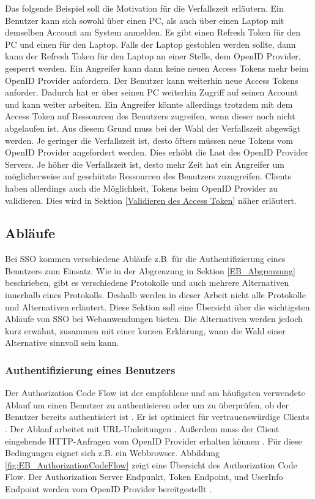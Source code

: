 Das folgende Beispiel soll die Motivation für die Verfallszeit erläutern. Ein Benutzer kann sich sowohl über einen PC, als auch über einen Laptop mit demselben Account am System anmelden. Es gibt einen Refresh Token für den PC und einen für den Laptop. Falls der Laptop gestohlen werden sollte, dann kann der Refresh Token für den Laptop an einer Stelle, dem OpenID Provider, gesperrt werden. Ein Angreifer kann dann keine neuen Access Tokens mehr beim OpenID Provider anfordern. Der Benutzer kann weiterhin neue Access Tokens anforder. Dadurch hat er über seinen PC weiterhin Zugriff auf seinen Account und kann weiter arbeiten. Ein Angreifer könnte allerdings trotzdem mit dem Access Token auf Ressourcen des Benutzers zugreifen, wenn dieser noch nicht abgelaufen ist. Aus diesem Grund muss bei der Wahl der Verfallszeit abgewägt werden. Je geringer die Verfallszeit ist, desto öfters müssen neue Tokens vom OpenID Provider angefordert werden. Dies erhöht die Last des OpenID Provider Servers. Je höher die Verfallszeit ist, desto mehr Zeit hat ein Angreifer um möglicherweise auf geschützte Ressourcen des Benutzers zuzugreifen. Clients haben allerdings auch die Möglichkeit, Tokens beim OpenID Provider zu validieren. Dies wird in Sektion \ref{Validieren des Access Token} näher erläutert.

\subsection{Abläufe} \label{EB_Abläufe}

Bei SSO kommen verschiedene Abläufe z.B. für die Authentifizierung eines Benutzers zum Einsatz. Wie in der Abgrenzung in Sektion \ref{EB_Abgrenzung} beschrieben, gibt es verschiedene Protokolle und auch mehrere Alternativen innerhalb eines Protokolls. Deshalb werden in dieser Arbeit nicht alle Protokolle und Alternativen erläutert. Diese Sektion soll eine Übersicht über die wichtigsten Abläufe von SSO bei Webanwendungen bieten. Die Alternativen werden jedoch kurz erwähnt, zusammen mit einer kurzen Erklärung, wann die Wahl einer Alternative sinnvoll sein kann. %

\subsubsection{Authentifizierung eines Benutzers} \label{EB_Authentifizierung_eines_Benutzers}

Der Authorization Code Flow ist der empfohlene und am häufigsten verwendete Ablauf um einen Benutzer zu authentisieren oder um zu überprüfen, ob der Benutzer bereits authentisiert ist \cite{EB63}. Er ist optimiert für vertrauenswürdige Clients \cite{EB13}. Der Ablauf arbeitet mit URL-Umleitungen \cite{EB12}. Außerdem muss der Client eingehende HTTP-Anfragen vom OpenID Provider erhalten können \cite{EB12}. Für diese Bedingungen eignet sich z.B. ein Webbrowser. Abbildung \ref{fig:EB_AuthorizationCodeFlow} zeigt eine Übersicht des Authorization Code Flow. Der Authorization Server Endpunkt, Token Endpoint, und UserInfo Endpoint werden vom OpenID Provider bereitgestellt \cite{EB12} \cite{EB65}.


